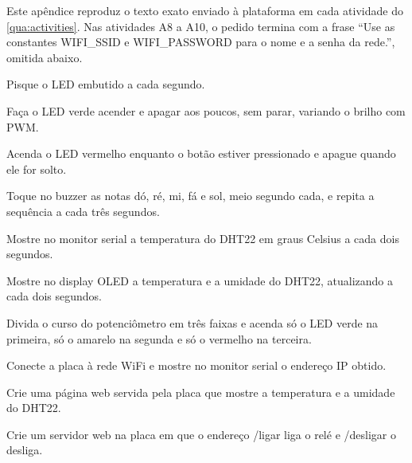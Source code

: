 \begin{apendicesenv}
Este apêndice reproduz o texto exato enviado à plataforma em cada atividade do \autoref{qua:activities}. Nas atividades A8 a A10, o pedido termina com a frase ``Use as constantes WIFI\_SSID e WIFI\_PASSWORD para o nome e a senha da rede.'', omitida abaixo.

\begin{alineas}
  \item[A1] Pisque o LED embutido a cada segundo.
  \item[A2] Faça o LED verde acender e apagar aos poucos, sem parar, variando o brilho com PWM.
  \item[A3] Acenda o LED vermelho enquanto o botão estiver pressionado e apague quando ele for solto.
  \item[A4] Toque no buzzer as notas dó, ré, mi, fá e sol, meio segundo cada, e repita a sequência a cada três segundos.
  \item[A5] Mostre no monitor serial a temperatura do DHT22 em graus Celsius a cada dois segundos.
  \item[A6] Mostre no display OLED a temperatura e a umidade do DHT22, atualizando a cada dois segundos.
  \item[A7] Divida o curso do potenciômetro em três faixas e acenda só o LED verde na primeira, só o amarelo na segunda e só o vermelho na terceira.
  \item[A8] Conecte a placa à rede WiFi e mostre no monitor serial o endereço IP obtido.
  \item[A9] Crie uma página web servida pela placa que mostre a temperatura e a umidade do DHT22.
  \item[A10] Crie um servidor web na placa em que o endereço /ligar liga o relé e /desligar o desliga.
\end{alineas}

\end{apendicesenv}

